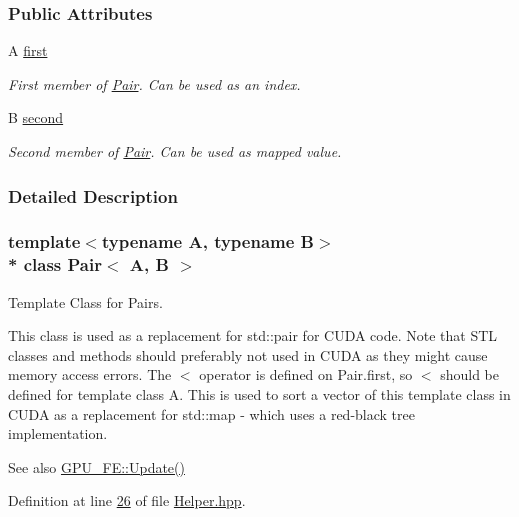 \subsubsection*{Public Attributes}
\begin{DoxyCompactItemize}
\item 
A \hyperlink{classPair_a98924311a2986df358d3b1965f8abd06}{first}
\begin{DoxyCompactList}\small\item\em First member of \hyperlink{classPair}{Pair}. Can be used as an index. \end{DoxyCompactList}\item 
B \hyperlink{classPair_af49ec2d61a46cad5cd1227dba4932aff}{second}
\begin{DoxyCompactList}\small\item\em Second member of \hyperlink{classPair}{Pair}. Can be used as mapped value. \end{DoxyCompactList}\end{DoxyCompactItemize}


\subsubsection{Detailed Description}
\subsubsection*{template$<$typename A, typename B$>$\\*
class Pair$<$ A, B $>$}

Template Class for Pairs. 

This class is used as a replacement for std\+::pair for C\+U\+DA code. Note that S\+TL classes and methods should preferably not used in C\+U\+DA as they might cause memory access errors. The \textquotesingle{}$<$\textquotesingle{} operator is defined on Pair.\+first, so \textquotesingle{}$<$\textquotesingle{} should be defined for template class A. This is used to sort a vector of this template class in C\+U\+DA as a replacement for std\+::map -\/ which uses a red-\/black tree implementation. \begin{DoxySeeAlso}{See also}
\hyperlink{classGPU__FE_aa9039bd613961d4e0911b8514ed14fba}{G\+P\+U\+\_\+\+F\+E\+::\+Update()} 
\end{DoxySeeAlso}


Definition at line \hyperlink{Helper_8hpp_source_l00026}{26} of file \hyperlink{Helper_8hpp_source}{Helper.\+hpp}.



